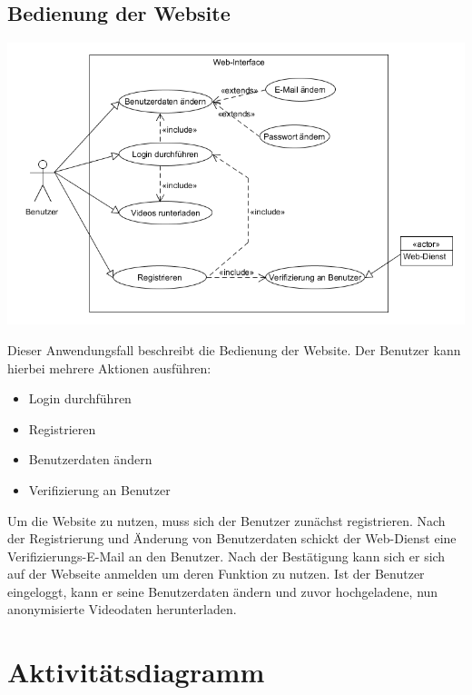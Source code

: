 \subsection{Bedienung der Website}
\begin{center}
\includegraphics[width=1\textwidth]{subtopicsFuncspec/Res/systemModels/WebsiteAWFDiagram.png}
\end{center}	
Dieser Anwendungsfall beschreibt die Bedienung der Website.
Der Benutzer kann hierbei mehrere Aktionen ausführen:
\begin{itemize}
\itemsep0pt
\item Login durchführen
\item Registrieren
\item Benutzerdaten ändern
\item Verifizierung an Benutzer
\end{itemize}
Um die Website zu nutzen, muss sich der Benutzer zunächst registrieren. Nach der Registrierung und Änderung von Benutzerdaten schickt der \gls{Web-Dienst} eine Verifizierungs-\gls{E-Mail} an den Benutzer. Nach der Bestätigung kann sich er sich auf der Webseite anmelden um deren Funktion zu nutzen. Ist der Benutzer eingeloggt, kann er seine Benutzerdaten ändern und zuvor hochgeladene, nun anonymisierte Videodaten herunterladen.

\section{Aktivitätsdiagramm}
